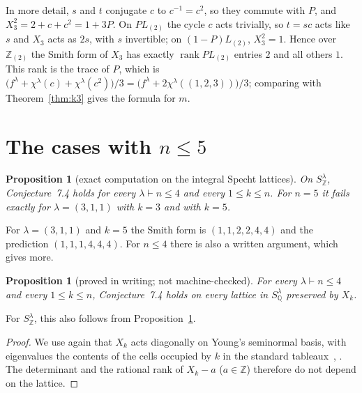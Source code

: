 \documentclass[11pt]{article}
\newtheorem{proposition}[theorem]{Proposition}
\theoremstyle{remark}
\newcommand{\Z}{\mathbb{Z}}
\newcommand{\Q}{\mathbb{Q}}
\begin{document}
\begin{appendices}
In more detail, $s$ and $t$ conjugate $c$ to $c^{-1}=c^2$, so they commute
with $P$, and $X_3^2=2+c+c^2=1+3P$. On $PL_{(2)}$ the cycle $c$ acts
trivially, so $t=sc$ acts like $s$ and $X_3$ acts as $2s$, with $s$
invertible; on $(1-P)L_{(2)}$, $X_3^2=1$. Hence over $\Z_{(2)}$ the Smith form
of $X_3$ has exactly $\operatorname{rank}PL_{(2)}$ entries $2$ and all others
$1$. This rank is the trace of $P$, which is
$\bigl(f^\lambda+\chi^\lambda(c)+\chi^\lambda(c^2)\bigr)/3
=\bigl(f^\lambda+2\chi^\lambda((1,2,3))\bigr)/3$; comparing with
Theorem~\ref{thm:k3} gives the formula for $m$.

\section{The cases with \texorpdfstring{$n\le5$}{n <= 5}}\label{sec:small}
\begin{proposition}[exact computation on the integral Specht lattices]\label{prop:small}
On $S^\lambda_\Z$, Conjecture~7.4 holds for every $\lambda\vdash n\le4$ and
every $1\le k\le n$. For $n=5$ it fails exactly for $\lambda=(3,1,1)$ with
$k=3$ and with $k=5$.
\end{proposition}

For
$\lambda=(3,1,1)$ and $k=5$ the Smith form is $(1,1,2,2,4,4)$ and the
prediction $(1,1,1,4,4,4)$. For $n\le4$ there is also a written argument,
which gives more.

\begin{proposition}[proved in writing; not machine-checked]\label{prop:anylattice}
For every $\lambda\vdash n\le4$ and every $1\le k\le n$, Conjecture~7.4 holds
on every lattice in $S^\lambda_\Q$ preserved by $X_k$.
\end{proposition}

For $S^\lambda_\Z$, this also follows from Proposition~\ref{prop:small}.

\begin{proof}
We use again that $X_k$ acts diagonally on Young's seminormal basis, with
eigenvalues the contents of the cells occupied by $k$ in the standard
tableaux~\cite{murphy}, \cite[Theorem~5.8]{vo}. The determinant and the rational rank of
$X_k-a$ ($a\in\Z$) therefore do not depend on the lattice.


\end{proof}
\end{appendices}
\end{document}
